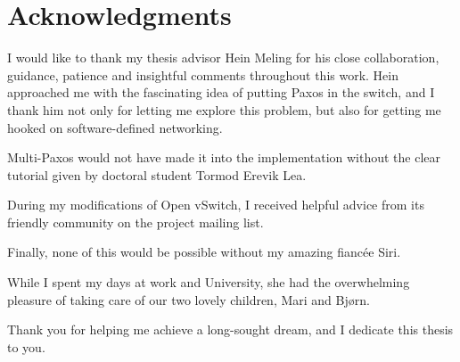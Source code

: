 \cleardoublepage%
\chapter*{Acknowledgments}%
\thispagestyle{empty}%

I would like to thank my thesis advisor Hein Meling for his close
collaboration, guidance, patience and insightful comments throughout this
work.
%
Hein approached me with the fascinating idea of putting Paxos in the
switch, and I thank him not only for letting me explore this problem, but
also for getting me hooked on software-defined networking.

Multi-Paxos would not have made it into the implementation without the
clear tutorial given by doctoral student Tormod Erevik Lea.

During my modifications of Open vSwitch, I received helpful advice from
its friendly community on the project mailing list.

Finally, none of this would be possible without my amazing fiancée Siri.

While I spent my days at work and University, she had the overwhelming
pleasure of taking care of our two lovely children, Mari and Bjørn.

Thank you for helping me achieve a long-sought dream, and I dedicate this
thesis to you.
